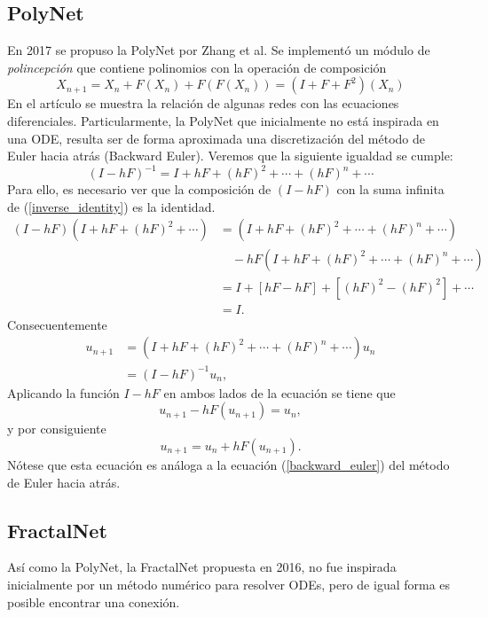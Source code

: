 \subsection{PolyNet}
En 2017 se propuso la PolyNet \cite{polynet} por Zhang et al. Se implementó un módulo de \textsl{polincepción} que contiene polinomios con la operación de composición
\begin{equation}
   X_{n+1} = X_n + F(X_n) + F(F(X_n)) = (I+F+F^2)(X_n)
\end{equation}
En el artículo \cite{numerical_ode_and_architectures} se muestra la relación de algunas redes con las ecuaciones diferenciales. Particularmente, la PolyNet que inicialmente no está inspirada en una ODE, resulta ser de forma aproximada una discretización del método de Euler hacia atrás (Backward Euler). Veremos que la siguiente igualdad se cumple:
\begin{equation}
   \label{inverse_identity}
   (I-hF)^{-1} = I + hF + (hF)^2 + \cdots + (hF)^n + \cdots 
\end{equation}
Para ello, es necesario ver que la composición de $(I-hF)$ con la suma infinita de (\ref{inverse_identity}) es la identidad.
\begin{align*}
   (I-hF)(I + hF + (hF)^2 + \cdots ) &=  (I + hF + (hF)^2 + \cdots + (hF)^n + \cdots ) \\
      & \quad - hF(I + hF + (hF)^2 + \cdots + (hF)^n + \cdots ) \\
   &= I + [hF - hF] + [(hF)^2 - (hF)^2] + \cdots \\
   &= I.
\end{align*}
Consecuentemente 
\begin{align*}
   u_{n+1} &= (I + hF + (hF)^2 + \cdots + (hF)^n + \cdots)u_n \\
      &=  (I-hF)^{-1}u_n,
\end{align*}
Aplicando la función $I-hF$ en ambos lados de la ecuación se tiene que 
\begin{equation}
   u_{n+1} - hF(u_{n+1}) = u_n, 
\end{equation}
y por consiguiente
\begin{equation}
   u_{n+1}  = u_n + hF(u_{n+1}).
\end{equation}
Nótese que esta ecuación es análoga a la ecuación (\ref{backward_euler}) del método de Euler hacia atrás.


\subsection{FractalNet} Así como la PolyNet, la FractalNet \cite{fractalNet}propuesta en 2016, no fue inspirada inicialmente por un método numérico para resolver ODEs, pero de igual forma es posible encontrar una conexión.

